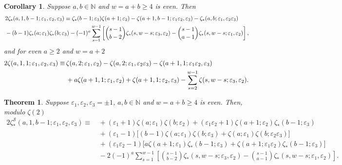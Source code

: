 \documentclass[10pt,a4paper]{amsart}
\newtheorem{cor}{Corollary}
\newtheorem{thm}{Theorem}
\newcommand{\N}{\mathbb{N}}
\newcommand{\Sy}{{\mathcal S}}
\newcommand\eps{{\varepsilon}}
\begin{document}
\begin{cor}\label{cor:zeta(a,1,b-1);e1,e2,e3}
Suppose $a,b\in\N$ and $w=a+b\ge 4$ is even. Then
\begin{align}
&\,  2 \zeta_*(a,1,b-1;\eps_1,\eps_2,\eps_3) \equiv
 \zeta_*(b-1;\eps_3)\zeta(a+1; \eps_2)-\zeta(a+1,b-1; \eps_1\eps_2,\eps_3)-\zeta_*(a,b;\eps_1,\eps_2\eps_3) \notag\\
&\, -(b-1) \zeta_*(a;\eps_1) \zeta_*(b;\eps_3)
  -(-1)^{a}\sum_{s=1}^{w-1}\left[ \binom{s-1}{b-2} \zeta_*(s,w-s;\eps_3,\eps_2) -\binom{s-1}{a-1}\zeta_*(s,w-s;\eps_1,\eps_2)\right],  \label{equ:a1b-1ES}
\end{align}
and for even $a\ge 2$ and $w=a+2$
\begin{align}
  2 \zeta(a,1,1;\eps_1,\eps_2,\eps_3)
\equiv &\,\zeta(a,2;\eps_1,\eps_2)-\zeta(a,2;\eps_1,\eps_2\eps_3) -\zeta(a+1,1;\eps_1\eps_2,\eps_3) \notag \\
 &\,+a\zeta(a+1,1;\eps_1,\eps_2)+\zeta(a+1,1;\eps_2,\eps_3)  -\sum_{s=2}^{w-1}\zeta(s,w-s;\eps_3,\eps_2) . \label{equ:a11ES}
\end{align}
\end{cor}

\begin{thm}\label{thm:SMZV(a,1,b-1;e1,e2,e3)}
Suppose $\eps_1, \eps_2,\eps_3 =\pm 1$, $a,b\in\N$ and $w=a+b\ge 4$ is even. Then, modulo $\zeta(2)$
\begin{align*}
2\zeta_\ast^\Sy(a,1,b-1; \eps_1,\eps_2,\eps_3)
 \equiv&\,    + (\eps_1+1)\zeta(a;\eps_1)\zeta(b;\eps_2) + (\eps_1 \eps_2+1)\zeta(a+1; \eps_2)\zeta_*(b-1;\eps_3)  \\
&\,+ (\eps_1-1) \Big[(b-1)\zeta(a;\eps_1)\zeta(b; \eps_3)+\zeta(a;\eps_1)\zeta(b;\eps_2\eps_3)\Big] \\
&\, + (\eps_1 \eps_2-1) \Big[ a \zeta(a+1; \eps_1)\zeta_*(b-1;\eps_3)+\zeta(a+1; \eps_1\eps_2)\zeta_*(b-1;\eps_3)\Big]\\
&\,    -2(-1)^{a}\sum_{s=1}^{w-1}\left[ \binom{s-1}{b-2} \zeta_*(s,w-s;\eps_3,\eps_2) -\binom{s-1}{a-1}\zeta_*(s,w-s;\eps_1,\eps_2)\right] .
\end{align*}
\end{thm}
\end{document}
